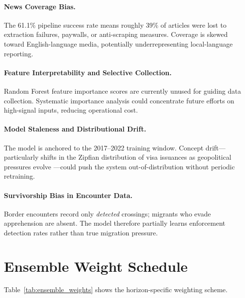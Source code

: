 \documentclass[11pt, a4paper]{article}
\begin{document}
\begin{appendices}
\paragraph{News Coverage Bias.}
The 61.1\% pipeline success rate means roughly 39\% of articles were lost to extraction
failures, paywalls, or anti-scraping measures.  Coverage is skewed toward
English-language media, potentially underrepresenting local-language reporting.

\paragraph{Feature Interpretability and Selective Collection.}
Random Forest feature importance scores are currently unused for guiding data
collection.  Systematic importance analysis could concentrate future efforts on
high-signal inputs, reducing operational cost.

\paragraph{Model Staleness and Distributional Drift.}
The model is anchored to the 2017--2022 training window.  Concept drift---particularly
shifts in the Zipfian distribution of visa issuances as geopolitical pressures evolve
---could push the system out-of-distribution without periodic retraining.

\paragraph{Survivorship Bias in Encounter Data.}
Border encounters record only \textit{detected} crossings; migrants who evade
apprehension are absent.  The model therefore partially learns enforcement detection
rates rather than true migration pressure.


\section{Ensemble Weight Schedule}\label{app:weights}

Table~\ref{tab:ensemble_weights} shows the horizon-specific weighting scheme.


\end{appendices}
\end{document}
